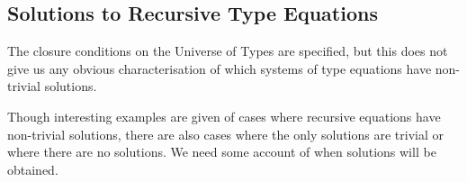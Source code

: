 \subsection{Solutions to Recursive Type Equations}

The closure conditions on the Universe of Types are specified,
but this does not give us any obvious characterisation of which
systems of type equations have non-trivial solutions.

Though interesting examples are given of cases where recursive equations
have non-trivial solutions, there are also cases where the only
solutions are trivial or where there are no solutions.
We need some account of when solutions will be obtained.  





